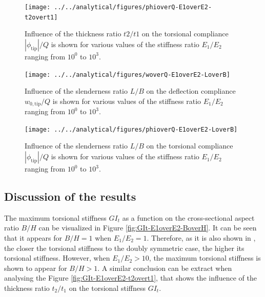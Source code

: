 \begin{figure}[!htpb] %
  \centering
  \texttt{[image: ../../analytical/figures/phioverQ-E1overE2-t2overt1]}
  \caption[Influence of the thickness ratio $t2/t1$ on the torsional compliance]{Influence of the thickness ratio $t2/t1$ on the torsional compliance $|\phi_{\mathrm{tip}}| / Q$ is shown for various values of the stiffness ratio $E_1/E_2$ ranging from $10^0$ to $10^3$. }\label{fig:phioverQ-E1overE2-t2overt1}
\end{figure}

\begin{figure}[!htpb] %
  \centering
  \texttt{[image: ../../analytical/figures/woverQ-E1overE2-LoverB]}
  \caption[Influence of the slenderness ratio $L/B$ on the deflection compliance]{Influence of the slenderness ratio $L/B$ on the deflection compliance $w_{\mathrm{0,tip}} / Q$ is shown for various values of the stiffness ratio $E_1/E_2$ ranging from $10^0$ to $10^3$. }\label{fig:woverQ-E1overE2-LoverB}
\end{figure}

\begin{figure}[!htpb] %
  \centering
  \texttt{[image: ../../analytical/figures/phioverQ-E1overE2-LoverB]}
  \caption[Influence of the slenderness ratio $L/B$ on the torsional compliance]{Influence of the slenderness ratio $L/B$ on the torsional compliance $|\phi_{\mathrm{tip}}| / Q$ is shown for various values of the stiffness ratio $E_1/E_2$ ranging from $10^0$ to $10^3$. }\label{fig:phioverQ-E1overE2-LoverB}
\end{figure}

\clearpage
\subsection{Discussion of the results} \label{ubsec:disc_results_parametricStudy}

The maximum torsional stiffness $G I_t$ as a function on the cross-sectional aspect ratio $B/H$ can be visualized in Figure \ref{fig:GIt-E1overE2-BoverH}. It can be seen that it appears for $B/H = 1$ when $E_1/E_2 = 1$. Therefore, as it is also shown in \cite{Raither2013a}, the closer the torsional stiffness to the doubly symmetric case, the higher its torsional stiffness. However, when $E_1/E_2 > 10$, the maximum torsional stiffness is shown to appear for $B/H > 1$. A similar conclusion can be extract when analysing the Figure \ref{fig:GIt-E1overE2-t2overt1}, that shows the influence of the thickness ratio $t_2/t_1$ on the torsional stiffness $G I_t$.

